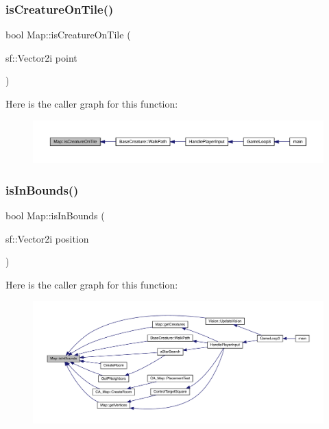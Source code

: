 \subsubsection{\texorpdfstring{is\+Creature\+On\+Tile()}{isCreatureOnTile()}}
{\footnotesize\ttfamily bool Map\+::is\+Creature\+On\+Tile (\begin{DoxyParamCaption}\item[{sf\+::\+Vector2i}]{point }\end{DoxyParamCaption})}

Here is the caller graph for this function\+:
\nopagebreak
\begin{figure}[H]
\begin{center}
\leavevmode
\includegraphics[width=350pt]{class_map_a22f7804f69757183a8b7093cf5b136ac_icgraph}
\end{center}
\end{figure}
\mbox{\label{class_map_aaf32aa299155bde102ea974acee38b3d}} 
\subsubsection{\texorpdfstring{is\+In\+Bounds()}{isInBounds()}}
{\footnotesize\ttfamily bool Map\+::is\+In\+Bounds (\begin{DoxyParamCaption}\item[{sf\+::\+Vector2i}]{position }\end{DoxyParamCaption})}

Here is the caller graph for this function\+:
\nopagebreak
\begin{figure}[H]
\begin{center}
\leavevmode
\includegraphics[width=350pt]{class_map_aaf32aa299155bde102ea974acee38b3d_icgraph}
\end{center}
\end{figure}
\mbox{\label{class_map_a4e045e2e1df74c3fcba4b860f240d498}} 
